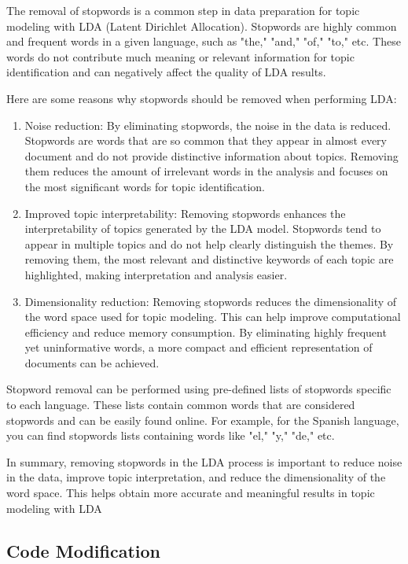 \documentclass[10pt]{article} %
\begin{document}
	The removal of stopwords is a common step in data preparation for topic modeling with LDA (Latent Dirichlet Allocation). Stopwords are highly common and frequent words in a given language, such as "the," "and," "of," "to," etc. These words do not contribute much meaning or relevant information for topic identification and can negatively affect the quality of LDA results.
	
	Here are some reasons why stopwords should be removed when performing LDA:
	\begin{enumerate}
		\item Noise reduction: By eliminating stopwords, the noise in the data is reduced. Stopwords are words that are so common that they appear in almost every document and do not provide distinctive information about topics. Removing them reduces the amount of irrelevant words in the analysis and focuses on the most significant words for topic identification.
		
		\item 	Improved topic interpretability: Removing stopwords enhances the interpretability of topics generated by the LDA model. Stopwords tend to appear in multiple topics and do not help clearly distinguish the themes. By removing them, the most relevant and distinctive keywords of each topic are highlighted, making interpretation and analysis easier.
		
		\item Dimensionality reduction: Removing stopwords reduces the dimensionality of the word space used for topic modeling. This can help improve computational efficiency and reduce memory consumption. By eliminating highly frequent yet uninformative words, a more compact and efficient representation of documents can be achieved.
	\end{enumerate}
	
	Stopword removal can be performed using pre-defined lists of stopwords specific to each language. These lists contain common words that are considered stopwords and can be easily found online. For example, for the Spanish language, you can find stopwords lists containing words like "el," "y," "de," etc.

	In summary, removing stopwords in the LDA process is important to reduce noise in the data, improve topic interpretation, and reduce the dimensionality of the word space. This helps obtain more accurate and meaningful results in topic modeling with LDA
	

	
	\subsection{Code Modification}
	
\end{document}
